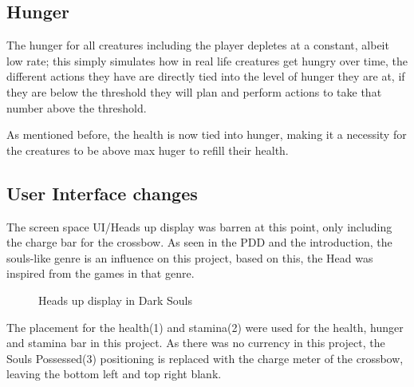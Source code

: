 \documentclass[11pt]{report}
\begin{document}

\subsection{Hunger}
The hunger for all creatures including the player depletes at a constant, albeit low rate; this simply simulates how in real life creatures get hungry over time, the different actions they have are directly tied into the level of hunger they are at, if they are below the threshold they will plan and perform actions to take that number above the threshold.

As mentioned before, the health is now tied into hunger, making it a necessity for the creatures to be above max huger to refill their health.

\subsection{User Interface changes}
The screen space UI/Heads up display was barren at this point, only including the charge bar for the crossbow.
As seen in the PDD and the introduction, the souls-like genre is an influence on this project, based on this, the Head was inspired from the games in that genre\cite{darkSouls3Wiki}.
\begin{figure}[H]
    \centering
    \caption{Heads up display in Dark Souls}
\end{figure}

The placement for the health(1) and stamina(2) were used for the health, hunger and stamina bar in this project. As there was no currency in this project, the Souls Possessed(3) positioning is replaced with the charge meter of the crossbow, leaving the bottom left and top right blank. 
\end{document}
